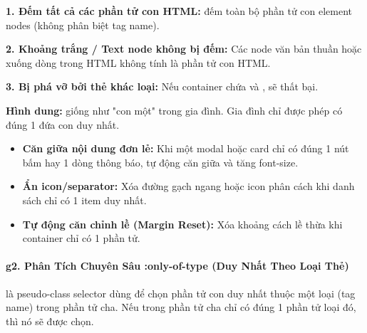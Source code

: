 \begin{warnBox}
\textbf{1. Đếm tất cả các phần tử con HTML:}  đếm toàn bộ phần tử con element nodes (không phân biệt tag name).
\par\vspace{4pt}
\textbf{2. Khoảng trắng / Text node không bị đếm:} Các node văn bản thuần hoặc xuống dòng trong HTML không tính là phần tử con HTML.
\par\vspace{4pt}
\textbf{3. Bị phá vỡ bởi thẻ khác loại:} Nếu container chứa  và ,  sẽ thất bại.
\end{warnBox}

\begin{tipBox}
\textbf{Hình dung:}  giống như "con một" trong gia đình. Gia đình chỉ được phép có đúng 1 đứa con duy nhất.
\end{tipBox}

\begin{conceptBox}
\begin{itemize}[leftmargin=1.5em, itemsep=3pt, parsep=0pt]
    \item \textbf{Căn giữa nội dung đơn lẻ:} Khi một modal hoặc card chỉ có đúng 1 nút bấm hay 1 dòng thông báo, tự động căn giữa và tăng font-size.
    \item \textbf{Ẩn icon/separator:} Xóa đường gạch ngang hoặc icon phân cách khi danh sách chỉ có 1 item duy nhất.
    \item \textbf{Tự động căn chỉnh lề (Margin Reset):} Xóa khoảng cách lề thừa khi container chỉ có 1 phần tử.
\end{itemize}
\end{conceptBox}


\paragraph{g2. Phân Tích Chuyên Sâu :only-of-type (Duy Nhất Theo Loại Thẻ)}
\mbox{}\par\vspace{2pt}

 là pseudo-class selector dùng để chọn phần tử con duy nhất thuộc một loại (tag name) trong phần tử cha. Nếu trong phần tử cha chỉ có đúng 1 phần tử loại đó, thì nó sẽ được chọn.

